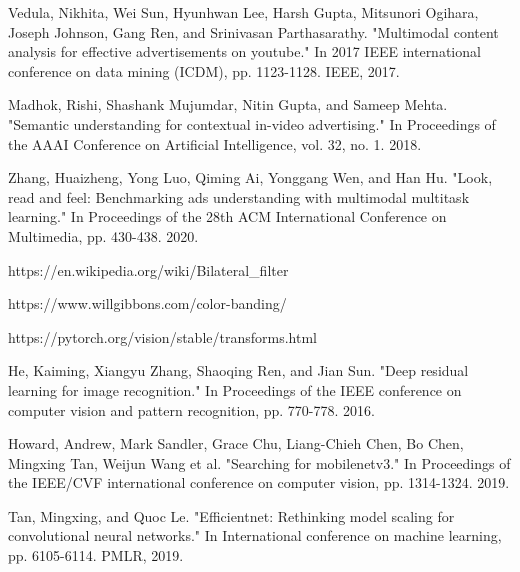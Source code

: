 \documentclass[conference]{IEEEtran}
\begin{document}
\begin{thebibliography}{00}
 Vedula, Nikhita, Wei Sun, Hyunhwan Lee, Harsh Gupta, Mitsunori Ogihara, Joseph Johnson, Gang Ren, and Srinivasan Parthasarathy. "Multimodal content analysis for effective advertisements on youtube." In 2017 IEEE international conference on data mining (ICDM), pp. 1123-1128. IEEE, 2017.

 Madhok, Rishi, Shashank Mujumdar, Nitin Gupta, and Sameep Mehta. "Semantic understanding for contextual in-video advertising." In Proceedings of the AAAI Conference on Artificial Intelligence, vol. 32, no. 1. 2018.

 Zhang, Huaizheng, Yong Luo, Qiming Ai, Yonggang Wen, and Han Hu. "Look, read and feel: Benchmarking ads understanding with multimodal multitask learning." In Proceedings of the 28th ACM International Conference on Multimedia, pp. 430-438. 2020.

 https://en.wikipedia.org/wiki/Bilateral\_filter

 https://www.willgibbons.com/color-banding/

 https://pytorch.org/vision/stable/transforms.html

 He, Kaiming, Xiangyu Zhang, Shaoqing Ren, and Jian Sun. "Deep residual learning for image recognition." In Proceedings of the IEEE conference on computer vision and pattern recognition, pp. 770-778. 2016.

 Howard, Andrew, Mark Sandler, Grace Chu, Liang-Chieh Chen, Bo Chen, Mingxing Tan, Weijun Wang et al. "Searching for mobilenetv3." In Proceedings of the IEEE/CVF international conference on computer vision, pp. 1314-1324. 2019.

 Tan, Mingxing, and Quoc Le. "Efficientnet: Rethinking model scaling for convolutional neural networks." In International conference on machine learning, pp. 6105-6114. PMLR, 2019.

\end{thebibliography}
\end{document}
